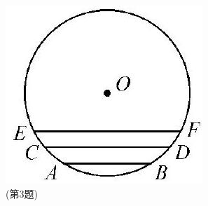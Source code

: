 \documentclass[10pt]{article}
\begin{document}
\includegraphics[max width=\textwidth, center]{2024_10_30_66b8e5e701da2093c133g-020(2)}\\
(第3题)
\end{document}
